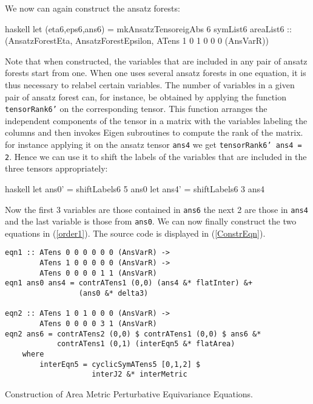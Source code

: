 We now can again construct the ansatz forests:
\begin{center}
\begin{cminted}{haskell}
let (eta6,eps6,ans6) = mkAnsatzTensoreigAbs 6 symList6 areaList6 :: 
                       (AnsatzForestEta, AnsatzForestEpsilon,
                       ATens 1 0 1 0 0 0 (AnsVarR))
\end{cminted}
\end{center}
Note that when constructed, the variables that are included in any pair of ansatz forests start from one. When one uses several ansatz forests in one equation, it is thus necessary to relabel certain variables. The number of variables in a given pair of ansatz forest can, for instance, be obtained by applying the function \texttt{tensorRank6'} on the corresponding tensor. This function arranges the independent components of the tensor in a matrix with the variables labeling the columns and then invokes Eigen subroutines to compute the rank of the matrix. for instance applying it on the ansatz tensor \texttt{ans4} we get \texttt{tensorRank6' ans4 = 2}. Hence we can use it to shift the labels of the variables that are included in the three tensors appropriately:
\begin{center}
\begin{cminted}{haskell}
let ans0' = shiftLabels6 5 ans0
let ans4' = shiftLabels6 3 ans4 
\end{cminted}
\end{center}

Now the first 3 variables are those contained in \texttt{ans6} the next 2 are those in \texttt{ans4} and the last variable is those from \texttt{ans0}.
We can now finally construct the two equations in (\ref{order1}). The source code is displayed in (\ref{ConstrEqn}).
\begin{listing}[hbt!]
\begin{verbatim}
eqn1 :: ATens 0 0 0 0 0 0 (AnsVarR) ->
        ATens 1 0 0 0 0 0 (AnsVarR) ->
        ATens 0 0 0 0 1 1 (AnsVarR)
eqn1 ans0 ans4 = contrATens1 (0,0) (ans4 &* flatInter) &+
                 (ans0 &* delta3)
                 
eqn2 :: ATens 1 0 1 0 0 0 (AnsVarR) ->
        ATens 0 0 0 0 3 1 (AnsVarR)
eqn2 ans6 = contrATens2 (0,0) $ contrATens1 (0,0) $ ans6 &*
            contrATens1 (0,1) (interEqn5 &* flatArea)
    where 
        interEqn5 = cyclicSymATens5 [0,1,2] $
                    interJ2 &* interMetric
\end{verbatim} 
\caption{Construction of Area Metric Perturbative Equivariance  Equations.}\label{ConstrEqn}
\end{listing}

